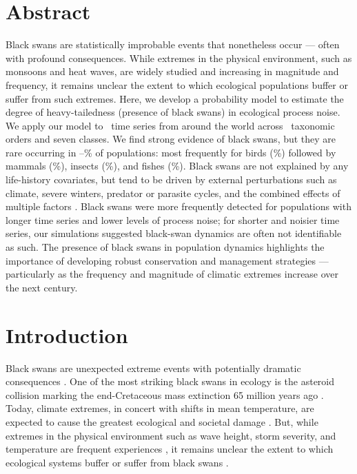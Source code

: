
\section{Abstract}

Black swans are statistically improbable events that nonetheless occur --- often with profound consequences. While extremes in the physical environment, such as monsoons and heat waves, are widely studied and increasing in magnitude and frequency, it remains unclear the extent to which ecological populations buffer or suffer from such extremes. Here, we develop a probability model to estimate the degree of heavy-tailedness (presence of black swans) in ecological process noise. We apply our model to \NPops~time series from around the world across \NOrders~taxonomic orders and seven classes. We find strong evidence of black swans, but they are rare occurring in \overallMinPerc--\overallMaxPerc\% of populations: most frequently for birds (\AvesRangePerc\%) followed by mammals (\MammaliaRangePerc\%), insects (\InsectaRangePerc\%), and fishes (\OsteichthyesRangePerc\%). Black swans are not explained by any life-history covariates, but tend to be driven by external perturbations such as climate, severe winters, predator or parasite cycles, and the combined effects of multiple factors . Black swans were more frequently detected for populations with longer time series and lower levels of process noise; for shorter and noisier time series, our simulations suggested black-swan dynamics are often not identifiable as such. The presence of black swans in population dynamics highlights the importance of developing robust conservation and management strategies --- particularly as the frequency and magnitude of climatic extremes increase over the next century.

\section{Introduction}

Black swans are unexpected extreme events with potentially dramatic consequences \citep{taleb2007,sornette2009}. One of the most striking black swans in ecology is the asteroid collision marking the end-Cretaceous mass extinction 65 million years ago \citep{alvarez1980,harnik2012}. Today, climate extremes, in concert with shifts in mean temperature, are expected to cause the greatest ecological and societal damage \citep{ipcc2012}. But, while extremes in the physical environment such as wave height, storm severity, and temperature are frequent experiences \citep{gaines1993,katz2005}, it remains unclear the extent to which ecological systems buffer or suffer from black swans \citep{nunez2012}.

